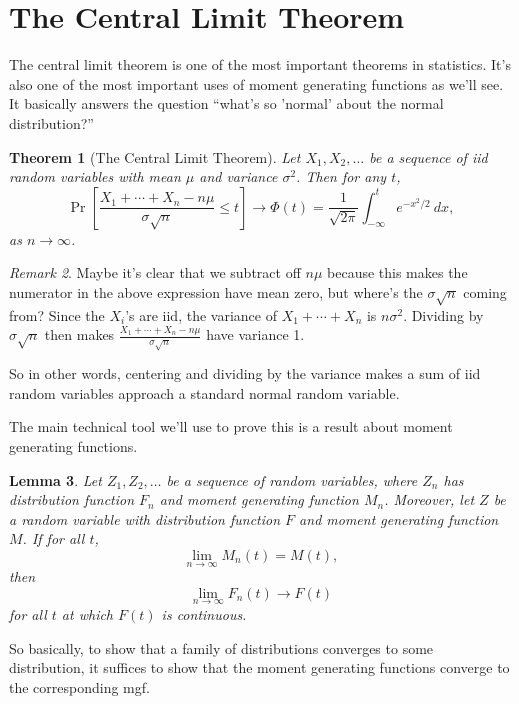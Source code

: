 \documentclass[12pt]{article}
\theoremstyle{plain}
\newtheorem{theorem}{Theorem}[section]
\newtheorem{lemma}[theorem]{Lemma}
\theoremstyle{definition}
\theoremstyle{remark}
\newtheorem{remark}[theorem]{Remark}
\begin{document}
\section{The Central Limit Theorem}
The central limit theorem is one of the most important theorems in statistics.
It's also one of the most important uses of moment generating functions as we'll see.
It basically answers the question ``what's so 'normal' about the normal distribution?''
\begin{theorem}[The Central Limit Theorem]
    Let $X_1, X_2, \ldots$ be a sequence of iid random variables with mean $\mu$ and variance $\sigma^2$.
    Then for any $t$,
    \[
        \Pr\left[ \frac{X_1 + \cdots+ X_n - n\mu}{\sigma \sqrt{n}} \leq t\right] \to \Phi(t) = \frac{1}{\sqrt{2\pi}}\int_{-\infty}^te^{-x^2/2}\ dx,
    \]
    as $n\to \infty$.
\end{theorem}
\begin{remark}
    Maybe it's clear that we subtract off $n\mu$ because this makes the numerator in the above expression have mean zero, but where's the $\sigma \sqrt{n}$ coming from?
    Since the $X_i$'s are iid, the variance of $X_1 + \cdots + X_n$ is $n\sigma^2$.
    Dividing by $\sigma \sqrt{n}$ then makes $\frac{X_1 + \cdots + X_n - n\mu}{\sigma \sqrt{n}}$ have variance 1.

    So in other words, centering and dividing by the variance makes a sum of iid random variables approach a standard normal random variable.
\end{remark}

The main technical tool we'll use to prove this is a result about moment generating functions.
\begin{lemma}
    Let $Z_1, Z_2, \ldots$ be a sequence of random variables, where $Z_n$ has distribution function $F_n$ and moment generating function $M_n$.
    Moreover, let $Z$ be a random variable with distribution function $F$ and moment generating function $M$.
    If for all $t$,
    \[
        \lim_{n\to \infty}M_n(t) = M(t),
    \]
    then
    \[
        \lim_{n\to \infty}F_n(t) \to F(t)
    \]
    for all $t$ at which $F(t)$ is continuous.
\end{lemma}
So basically, to show that a family of distributions converges to some distribution, it suffices to show that the moment generating functions converge to the corresponding mgf.
\end{document}
